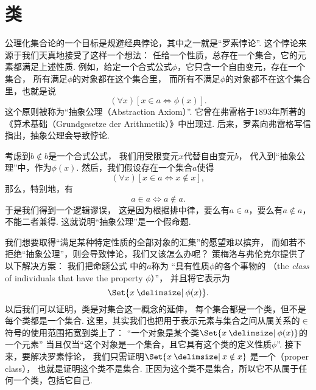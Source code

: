 
\section{类}
公理化集合论的一个目标是规避经典悖论，其中之一就是“罗素悖论”.
这个悖论来源于我们天真地接受了这样一个想法：
任给一个性质，总存在一个集合，它的元素都满足上述性质.
例如，给定一个合式公式\(\phi\)，它只含一个自由变元，存在一个集合，
所有满足\(\phi\)的对象都在这个集合里，
而所有不满足\(\phi\)的对象都不在这个集合里，也就是说
\begin{equation}\label{equation:集合论.类的逻辑表示}
	(\forall x)[x \in a \iff \phi(x)].
\end{equation}
这个原则被称为“抽象公理（Abstraction Axiom）”.
它曾在弗雷格于1893年所著的《算术基础（Grundgesetze der Arithmetik）》中出现过.
后来，罗素向弗雷格写信指出，抽象公理会导致悖论.

考虑到\(b \notin b\)是一个合式公式，
我们用受限变元\(x\)代替自由变元\(b\)，
代入到“抽象公理”中，作为\(\phi(x)\).
然后，我们假设存在一个集合\(a\)使得\[
	(\forall x)[x \in a \iff x \notin x],
\]
那么，特别地，有\[
	a \in a \iff a \notin a.
\]
于是我们得到一个逻辑谬误，
这是因为根据排中律，要么有\(a \in a\)，要么有\(a \notin a\)，不能二者兼得.
这就说明“抽象公理”是一个假命题.

我们想要取得“满足某种特定性质的全部对象的汇集”的愿望难以摈弃，
而如若不拒绝“抽象公理”，则会导致悖论，我们又该怎么办呢？
策梅洛与弗伦克尔提供了以下解决方案：
我们把命题公式  中的\(a\)称为%
“具有性质\(\phi\)的各个事物的%
（the \emph{class} of individuals that have the property \(\phi\)）”，
并且将它表示为
\begin{equation}
	\Set{ x \given \phi(x) }.
\end{equation}
以后我们可以证明，类是对集合这一概念的延伸，
每个集合都是一个类，但不是每个类都是一个集合.
这里，其实我们也把用于表示元素与集合之间从属关系的\(\in\)符号的使用范围拓宽到类上了：
“一个对象是某个类\(\Set{ x \given \phi(x) }\)的一个元素”%
当且仅当“这个对象是一个集合，且它具有这个类的定义性质\(\phi\)”.
接下来，要解决罗素悖论，
我们只需证明\(\Set{ x \given x \notin x }\)%
是一个（proper class），
也就是证明这个类不是集合.
正因为这个类不是集合，所以它不从属于任何一个类，包括它自己.

